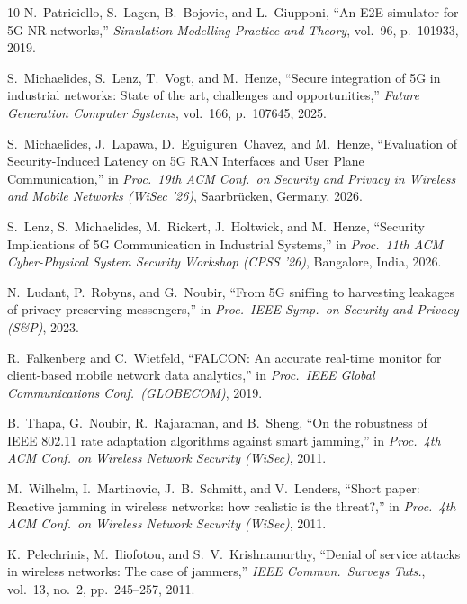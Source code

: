 \documentclass[conference]{IEEEtran}
\begin{document}
\begin{thebibliography}{10}
N.~Patriciello, S.~Lagen, B.~Bojovic, and L.~Giupponi,
``An E2E simulator for 5G NR networks,''
\emph{Simulation Modelling Practice and Theory}, vol.~96, p.~101933, 2019.

S.~Michaelides, S.~Lenz, T.~Vogt, and M.~Henze,
``Secure integration of 5G in industrial networks: State of the art, challenges and opportunities,''
\emph{Future Generation Computer Systems}, vol.~166, p.~107645, 2025.

S.~Michaelides, J.~Lapawa, D.~Eguiguren~Chavez, and M.~Henze,
``Evaluation of Security-Induced Latency on 5G RAN Interfaces and User Plane Communication,''
in \emph{Proc.\ 19th ACM Conf.\ on Security and Privacy in Wireless and Mobile Networks (WiSec '26)},
Saarbr\"ucken, Germany, 2026.

S.~Lenz, S.~Michaelides, M.~Rickert, J.~Holtwick, and M.~Henze,
``Security Implications of 5G Communication in Industrial Systems,''
in \emph{Proc.\ 11th ACM Cyber-Physical System Security Workshop (CPSS '26)},
Bangalore, India, 2026.

N.~Ludant, P.~Robyns, and G.~Noubir,
``From 5G sniffing to harvesting leakages of privacy-preserving messengers,''
in \emph{Proc.\ IEEE Symp.\ on Security and Privacy (S\&P)}, 2023.

R.~Falkenberg and C.~Wietfeld,
``FALCON: An accurate real-time monitor for client-based mobile network data analytics,''
in \emph{Proc.\ IEEE Global Communications Conf.\ (GLOBECOM)}, 2019.

B.~Thapa, G.~Noubir, R.~Rajaraman, and B.~Sheng,
``On the robustness of IEEE 802.11 rate adaptation algorithms against smart jamming,''
in \emph{Proc.\ 4th ACM Conf.\ on Wireless Network Security (WiSec)}, 2011.

M.~Wilhelm, I.~Martinovic, J.~B.~Schmitt, and V.~Lenders,
``Short paper: Reactive jamming in wireless networks: how realistic is the threat?,''
in \emph{Proc.\ 4th ACM Conf.\ on Wireless Network Security (WiSec)}, 2011.

K.~Pelechrinis, M.~Iliofotou, and S.~V.~Krishnamurthy,
``Denial of service attacks in wireless networks: The case of jammers,''
\emph{IEEE Commun.\ Surveys Tuts.}, vol.~13, no.~2, pp.~245--257, 2011.


\end{thebibliography}
\end{document}
